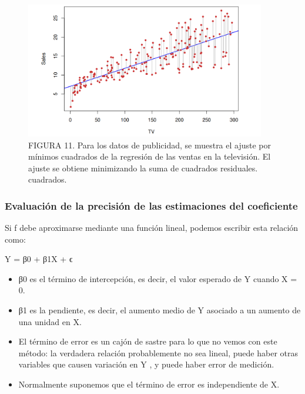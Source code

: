 \documentclass[
  letterpaper,
  DIV=11,
  numbers=noendperiod]{scrartcl}
\begin{document}
\begin{figure}

{\centering \includegraphics[width=4.125in,height=\textheight]{images/figura11.png}

}

\caption{FIGURA 11. Para los datos de publicidad, se muestra el ajuste
por mínimos cuadrados de la regresión de las ventas en la televisión. El
ajuste se obtiene minimizando la suma de cuadrados residuales.
cuadrados.}

\end{figure}

\hypertarget{evaluaciuxf3n-de-la-precisiuxf3n-de-las-estimaciones-del-coeficiente}{%
\subsubsection{\texorpdfstring{\textbf{Evaluación de la precisión de las
estimaciones del
coeficiente}}{Evaluación de la precisión de las estimaciones del coeficiente}}\label{evaluaciuxf3n-de-la-precisiuxf3n-de-las-estimaciones-del-coeficiente}}

Si f debe aproximarse mediante una función lineal, podemos escribir esta
relación como:

Y = β0 + β1X + ϵ

\begin{itemize}
\item
  β0 es el término de intercepción, es decir, el valor esperado de Y
  cuando X = 0.
\item
  β1 es la pendiente, es decir, el aumento medio de Y asociado a un
  aumento de una unidad en X.
\item
  El término de error es un cajón de sastre para lo que no vemos con
  este método: la verdadera relación probablemente no sea lineal, puede
  haber otras variables que causen variación en Y , y puede haber error
  de medición.
\item
  Normalmente suponemos que el término de error es independiente de X.
\end{itemize}
\end{document}
